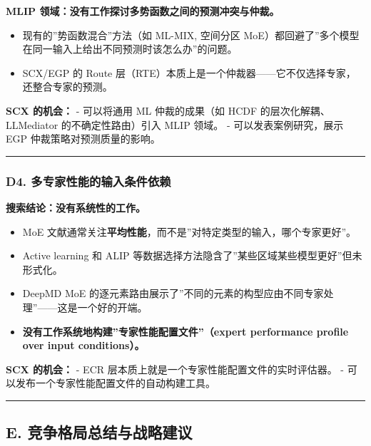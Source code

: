 \documentclass[
  12pt,
]{ctexart}
\providecommand{\tightlist}{%
  \setlength{\itemsep}{0pt}\setlength{\parskip}{0pt}}
\begin{document}
\textbf{MLIP 领域：没有工作探讨多势函数之间的预测冲突与仲裁。}

\begin{itemize}
\tightlist
\item
  现有的''势函数混合''方法（如 ML-MIX, 空间分区
  MoE）都回避了''多个模型在同一输入上给出不同预测时该怎么办''的问题。
\item
  SCX/EGP 的 Route
  层（RTE）本质上是一个仲裁器------它不仅选择专家，还整合专家的预测。
\end{itemize}

\textbf{SCX 的机会：} - 可以将通用 ML 仲裁的成果（如 HCDF
的层次化解耦、LLMediator 的不确定性路由）引入 MLIP 领域。 -
可以发表案例研究，展示 EGP 仲裁策略对预测质量的影响。

\begin{center}\rule{0.5\linewidth}{0.5pt}\end{center}

\subsubsection{D4.
多专家性能的输入条件依赖}\label{d4.-ux591aux4e13ux5bb6ux6027ux80fdux7684ux8f93ux5165ux6761ux4ef6ux4f9dux8d56}

\textbf{搜索结论：没有系统性的工作。}

\begin{itemize}
\tightlist
\item
  MoE
  文献通常关注\textbf{平均性能}，而不是''对特定类型的输入，哪个专家更好''。
\item
  Active learning 和 ALIP
  等数据选择方法隐含了''某些区域某些模型更好''但未形式化。
\item
  DeepMD MoE
  的逐元素路由展示了''不同的元素的构型应由不同专家处理''------这是一个好的开端。
\item
  \textbf{没有工作系统地构建''专家性能配置文件''（expert performance
  profile over input conditions）。}
\end{itemize}

\textbf{SCX 的机会：} - ECR
层本质上就是一个专家性能配置文件的实时评估器。 -
可以发布一个专家性能配置文件的自动构建工具。

\begin{center}\rule{0.5\linewidth}{0.5pt}\end{center}

\subsection{E.
竞争格局总结与战略建议}\label{e.-ux7adeux4e89ux683cux5c40ux603bux7ed3ux4e0eux6218ux7565ux5efaux8bae}
\end{document}
